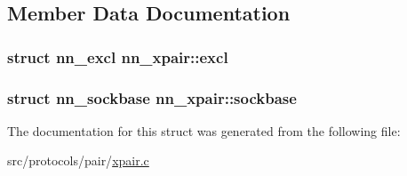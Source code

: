 \subsection{Member Data Documentation}
\subsubsection[{excl}]{\setlength{\rightskip}{0pt plus 5cm}struct {\bf nn\+\_\+excl} nn\+\_\+xpair\+::excl}\hypertarget{structnn__xpair_afa806b85b6074e3a0a0208f4d8604488}{}\label{structnn__xpair_afa806b85b6074e3a0a0208f4d8604488}
\subsubsection[{sockbase}]{\setlength{\rightskip}{0pt plus 5cm}struct {\bf nn\+\_\+sockbase} nn\+\_\+xpair\+::sockbase}\hypertarget{structnn__xpair_afe4579bfde9c85d49f8e0235063c50e8}{}\label{structnn__xpair_afe4579bfde9c85d49f8e0235063c50e8}


The documentation for this struct was generated from the following file\+:\begin{DoxyCompactItemize}
\item 
src/protocols/pair/\hyperlink{xpair_8c}{xpair.\+c}\end{DoxyCompactItemize}
